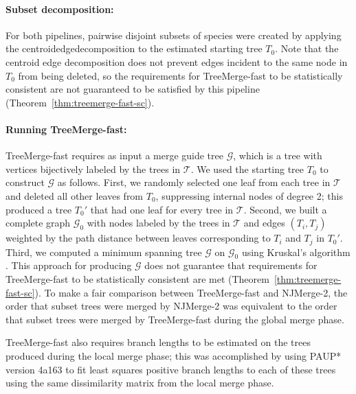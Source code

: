 \paragraph{Subset decomposition:} 
For both pipelines, pairwise disjoint subsets of species were created by applying the \gls{centroidedgedecomposition} to the estimated starting tree $T_0$.
Note that the centroid edge decomposition does not prevent edges incident to the same node in $T_0$ from being deleted, so the requirements for TreeMerge-fast to be statistically consistent are not guaranteed to be satisfied by this pipeline (Theorem~\ref{thm:treemerge-fast-sc}).


\paragraph{Running TreeMerge-fast:}
TreeMerge-fast requires as input a merge guide tree $\mathcal{G}$, which is a tree with vertices bijectively labeled by the trees in $\mathcal{T}$.
We used the starting tree $T_0$ to construct $\mathcal{G}$ as follows.
First, we randomly selected one leaf from each tree in $\mathcal{T}$ and deleted all other leaves from $T_0$, suppressing internal nodes of degree 2; this produced a tree $T_0'$ that had one leaf for every tree in $\mathcal{T}$.
Second, we built a complete graph $\mathcal{G}_0$ with nodes labeled by the trees in $\mathcal{T}$ and edges $(T_i, T_j )$ weighted by the path distance between leaves corresponding to $T_i$ and $T_j$ in $T_0'$.
Third, we computed a minimum spanning tree $\mathcal{G}$ on $\mathcal{G}_0$ using Kruskal's algorithm \cite{kruskal1956shortest}.
This approach for producing $\mathcal{G}$ does not guarantee that requirements for TreeMerge-fast to be statistically consistent are met (Theorem~\ref{thm:treemerge-fast-sc}).
To make a fair comparison between TreeMerge-fast and NJMerge-2, the order that subset trees were merged by NJMerge-2 was equivalent to the order that subset trees were merged by TreeMerge-fast during the global merge phase.

TreeMerge-fast also requires branch lengths to be estimated on the trees produced during the local merge phase; this was accomplished by using PAUP* version 4a163 to fit least squares positive branch lengths to each of these trees using the same dissimilarity matrix from the local merge phase.


